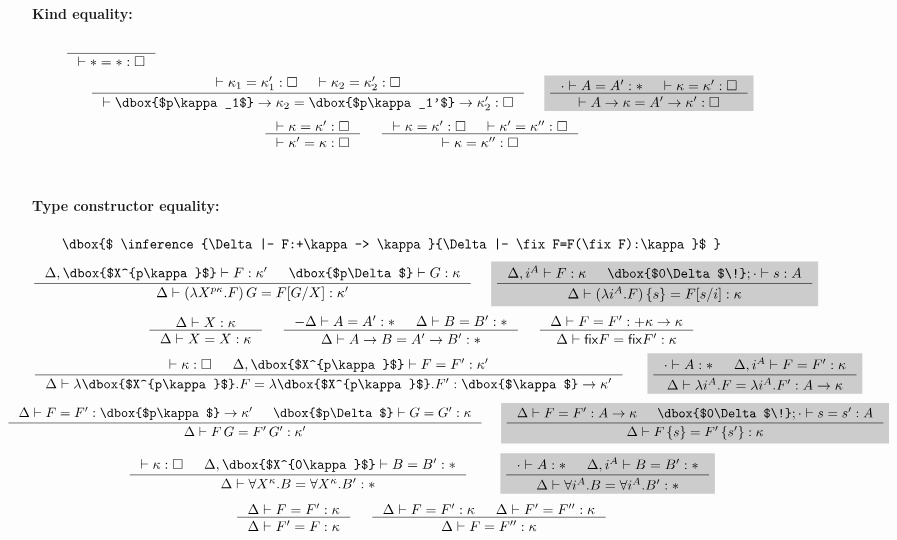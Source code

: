 \begin{figure}\begin{singlespace}\small
\paragraph{Kind equality:} 
$ \quad
 ~~~~
   \inference{}{|- * = *:\square} $
\[
   \inference{ |- \kappa_1 = \kappa_1' : \square
             & |- \kappa_2 = \kappa_2' : \square }{
   |- \dbox{$p\kappa_1$}-> \kappa_2 = \dbox{$p\kappa_1'$}-> \kappa_2' : \square}
 ~~~~ \newFi{
   \inference{\cdot |- A=A':* & |- \kappa=\kappa':\square}{
              |- A -> \kappa = A' -> \kappa' : \square} }
\]
\[ \inference{|- \kappa=\kappa':\square}{
              |- \kappa'=\kappa:\square}
 ~~~~
   \inference{ |- \kappa =\kappa' :\square
             & |- \kappa'=\kappa'':\square}{
              |- \kappa=\kappa'':\square}
\]
~
\paragraph{Type constructor equality:} 
$\qquad \dbox{$
   \inference{\Delta|- F:+\kappa-> \kappa}{\Delta|- \fix F=F(\fix F):\kappa}$ } $
\[
   \inference{ \Delta,\dbox{$X^{p\kappa}$} |- F:\kappa'
   	     & \dbox{$p\Delta$} |- G:\kappa}{
	      \Delta |- (\lambda X^{p\kappa}.F)\,G = F[G/X]:\kappa'}
 ~~~~ \newFi{
   \inference{ \Delta,i^A |- F:\kappa
             & \dbox{$0\Delta$\!};\cdot |- s:A}{
              \Delta |- (\lambda i^A.F)\,\{s\} = F[s/i]:\kappa} }
\]
\[ \inference{\Delta |- X:\kappa }{\Delta |- X=X:\kappa}
 ~~~~
   \inference{-\Delta |- A=A':* & \Delta |- B=B':*}{\Delta |- A-> B=A'-> B':*}
 ~~~~
   \inference{\Delta |- F=F' : +\kappa -> \kappa}{
	      \Delta |- \fix F = \fix F' : \kappa}
\]
\[
   \inference{ |- \kappa:\square
   	     & \Delta,\dbox{$X^{p\kappa}$} |- F=F' : \kappa'}{
   	\Delta |- \lambda \dbox{$X^{p\kappa}$}.F
		= \lambda \dbox{$X^{p\kappa}$}.F': \dbox{$\kappa$} -> \kappa'}
 ~~~~ ~
 \newFi{
   \inference{\cdot |- A:* & \Delta,i^A |- F=F' : \kappa}{
	      \Delta |- \lambda i^A.F=\lambda i^A.F' : A -> \kappa} }
\]
\[\!\!\!\!\!\!\!\!\!\!\!\!
   \inference{ \Delta |- F=F' : \dbox{$p\kappa$} -> \kappa'
   	     & \dbox{$p\Delta$} |- G=G':\kappa}{
              \Delta |- F\,G = F'\,G' : \kappa'}
 ~~~~
 \newFi{
   \inference{ \Delta |- F=F': A -> \kappa
             & \dbox{$0\Delta$\!};\cdot |- s=s':A}{
	      \Delta |- F\,\{s\} = F'\,\{s'\} : \kappa} }
\]
\[
   \inference{ |- \kappa:\square
   	     & \Delta,\dbox{$X^{0\kappa}$} |- B=B':*}{
              \Delta |- \forall X^\kappa.B=\forall X^\kappa.B':*}
 ~~~~ \quad
 \newFi{
   \inference{\cdot |- A:* & \Delta,i^A |- B=B':*}{
              \Delta |- \forall i^A.B=\forall i^A.B':*} }
\]
\[ \inference{\Delta |- F = F' : \kappa}{\Delta |- F' = F : \kappa}
 ~~~~
   \inference{\Delta |- F = F' : \kappa & \Delta |- F' = F'' : \kappa}{
              \Delta |- F = F'' : \kappa}
\]
~

\end{singlespace}
\end{figure}
